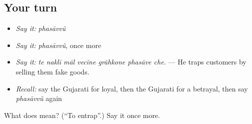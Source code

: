 \subsection*{Your turn}
\begin{itemize}
\raggedright
  \item \emph{Say it:} \emph{phasāvvũ}
  \item \emph{Say it:} \emph{phasāvvũ}, once more
  \item \emph{Say it:} \emph{te naklī māl vecīne grāhkone phasāve che.} — He traps customers by selling them fake goods.
  \item \emph{Recall:} say the Gujarati for loyal, then the Gujarati for a betrayal, then say \emph{phasāvvũ} again
\end{itemize}

\begin{tcolorbox}[breakable,colback=teal!4,colframe=teal!35!black,title={Before you move on}]
What does  mean? (\textquotedblleft{}To entrap\textquotedblright{}.) Say it once more.
\end{tcolorbox}
